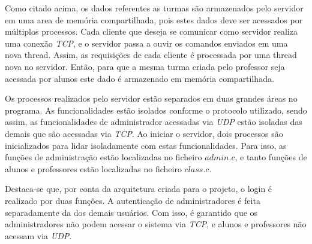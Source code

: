 \documentclass[a4paper]{article}
\begin{document}
Como citado acima, os dados referentes as turmas são armazenados pelo servidor em uma area de memória compartilhada, pois estes dados deve ser acessados por múltiplos processos. Cada cliente que deseja se comunicar como servidor realiza uma conexão \textit{TCP}, e o servidor passa a ouvir os comandos enviados em uma nova thread. Assim, as requisições de cada cliente é processada por uma thread nova no servidor. Então, para que a mesma turma criada pelo professor seja acessada por alunos este dado é armazenado em memória compartilhada.


Os processos realizados pelo servidor estão separados em duas grandes áreas no programa. As funcionalidades estão isolados conforme o protocolo utilizado, sendo assim, as funcionalidades de administrador acessadas via \textit{UDP} estão isoladas das demais que são acessadas via \textit{TCP}. Ao iniciar o servidor, dois processos são inicializados para lidar isoladamente com estas funcionalidades. Para isso, as funções de administração estão localizadas no ficheiro \(admin.c\), e tanto funções de alunos e professores  estão localizadas no ficheiro \(class.c\).

Destaca-se que, por conta da arquitetura criada para o projeto, o login é realizado por duas funções. A autenticação de administradores é feita separadamente da dos demais usuários. Com isso, é garantido que os administradores não podem acessar o sistema via \textit{TCP}, e alunos e professores não acessam via \textit{UDP}.








\end{document}
